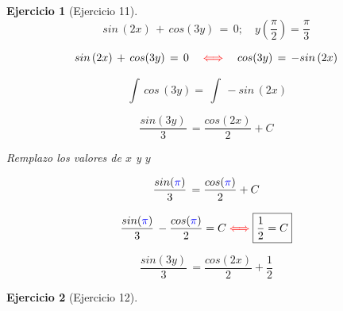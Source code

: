 \documentclass[a4paper,11pt]{book}
\newtheorem{ejer}{Ejercicio}[section]
\begin{document}
\begin{ejer}[Ejercicio 11] 
$$ sin\,(2x)\,+\,cos(3y)\,=\,0;\quad y(\dfrac{\pi}{2}) = \dfrac{\pi}{3} $$
  
$$ sin\,(2x)\,+\,cos(3y)\,=\,0 \quad \textcolor{red}{\iff} \quad cos(3y)\,=\, -sin\,(2x) $$


$$\displaystyle\,\int\,cos\,(3y) = \displaystyle\,\int\,-sin\,(2x) $$

$$\boxed{ \dfrac{sin(3y)}{3}\,=\dfrac{cos(2x)}{2} + C}$$

Remplazo los valores de $x$ y $y$ 

$$\dfrac{sin (\textcolor{blue}{\pi} )}{3}\,=\dfrac{cos(\textcolor{blue}{\pi})}{2} + C$$

$$\dfrac{sin (\textcolor{blue}{\pi} )}{3}\,-\dfrac{cos(\textcolor{blue}{\pi})}{2} = C \textcolor{red}{\iff} \boxed{\dfrac{1}{2} = C} $$

$$\boxed{ \dfrac{sin(3y)}{3}\,=\dfrac{cos(2x)}{2} + \dfrac{1}{2}}$$

\end{ejer} 

  

\begin{ejer}[Ejercicio 12] 

  

\end{ejer} 

  
\end{document}

